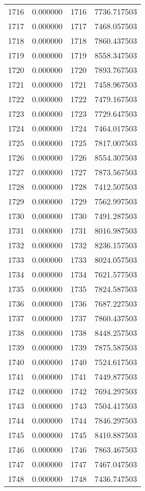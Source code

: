 \documentclass[12pt]{article}
\begin{document}
\begin{longtable}{@{}cccc@{}}
1716 & 0.000000 & 1716 & 7736.717503 \\
1717 & 0.000000 & 1717 & 7468.057503 \\
1718 & 0.000000 & 1718 & 7860.437503 \\
1719 & 0.000000 & 1719 & 8558.347503 \\
1720 & 0.000000 & 1720 & 7893.767503 \\
1721 & 0.000000 & 1721 & 7458.967503 \\
1722 & 0.000000 & 1722 & 7479.167503 \\
1723 & 0.000000 & 1723 & 7729.647503 \\
1724 & 0.000000 & 1724 & 7464.017503 \\
1725 & 0.000000 & 1725 & 7817.007503 \\
1726 & 0.000000 & 1726 & 8554.307503 \\
1727 & 0.000000 & 1727 & 7873.567503 \\
1728 & 0.000000 & 1728 & 7412.507503 \\
1729 & 0.000000 & 1729 & 7562.997503 \\
1730 & 0.000000 & 1730 & 7491.287503 \\
1731 & 0.000000 & 1731 & 8016.987503 \\
1732 & 0.000000 & 1732 & 8236.157503 \\
1733 & 0.000000 & 1733 & 8024.057503 \\
1734 & 0.000000 & 1734 & 7621.577503 \\
1735 & 0.000000 & 1735 & 7824.587503 \\
1736 & 0.000000 & 1736 & 7687.227503 \\
1737 & 0.000000 & 1737 & 7860.437503 \\
1738 & 0.000000 & 1738 & 8448.257503 \\
1739 & 0.000000 & 1739 & 7875.587503 \\
1740 & 0.000000 & 1740 & 7524.617503 \\
1741 & 0.000000 & 1741 & 7449.877503 \\
1742 & 0.000000 & 1742 & 7694.297503 \\
1743 & 0.000000 & 1743 & 7504.417503 \\
1744 & 0.000000 & 1744 & 7846.297503 \\
1745 & 0.000000 & 1745 & 8410.887503 \\
1746 & 0.000000 & 1746 & 7863.467503 \\
1747 & 0.000000 & 1747 & 7467.047503 \\
1748 & 0.000000 & 1748 & 7436.747503 \\

\end{longtable}
\end{document}
